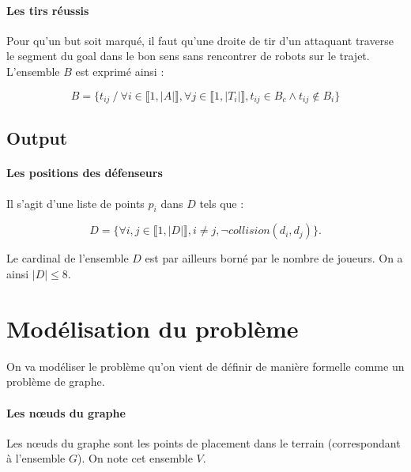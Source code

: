 \documentclass{article}
\begin{document}
\paragraph{Les tirs réussis}
Pour qu'un but soit marqué, il faut qu'une droite de tir d'un attaquant traverse le segment du goal dans le bon sens sans rencontrer de robots sur le trajet. L'ensemble $B$ est exprimé ainsi :

\begin{equation*}
    B = \{t_{ij} \ / \ \forall i \in \llbracket 1, |A| \rrbracket, \forall j \in \llbracket 1, |T_i| \rrbracket, t_{ij}  \in B_c \wedge t_{ij} \notin B_i  \}
\end{equation*}



\subsection{Output}

\paragraph{Les positions des défenseurs} Il s'agit d'une liste de points $p_i$ dans $D$ tels que :

\begin{equation*}
D = \{ \forall i, j \in \llbracket 1, |D| \rrbracket, i \ne j, \neg collision(d_i, d_j) \}.
\end{equation*}

Le cardinal de l'ensemble $D$ est par ailleurs borné par le nombre de joueurs. On a ainsi $|D| \leqslant 8$.



\section{Modélisation du problème}


On va modéliser le problème qu'on vient de définir de manière formelle comme un problème de graphe.

\paragraph{Les n\oe uds du graphe}
Les n\oe uds du graphe sont les points de placement dans le terrain (correspondant à l'ensemble $G$). On note cet ensemble $V$.
\end{document}
